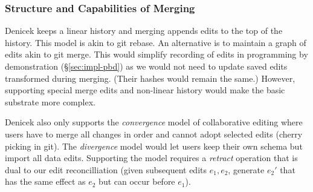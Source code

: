 \documentclass[sigconf,anonymous,screen]{acmart}
\newcommand{\ident}[1]{{\sffamily #1}}
\newcommand{\note}[1]{\textcolor{red}{#1}}
\begin{document}
%
%


\subsubsection*{Structure and Capabilities of Merging}
Denicek keeps a linear history and merging appends edits to the top of the history.
This model is akin to git rebase. An alternative is to maintain a graph of edits akin
to git merge. This would simplify recording of edits in programming by demonstration
(\S\ref{sec:impl-pbd}) as we would not need to update saved edits transformed
during merging. (Their hashes would remain the same.) However, supporting special
merge edits and non-linear history would make the basic substrate more complex.

Denicek also only supports the \emph{convergence} model of collaborative editing \cite{edwards-2025-schema}
where users have to merge all changes in order and cannot adopt selected edits (cherry
picking in git). The \emph{divergence} model would let users keep their own schema but
import all data edits. Supporting the model requires a \emph{retract} operation \cite{edwards-2021-typed}
that is dual to our edit reconcilliation (given subsequent edits $e_1, e_2$, generate
$e_2'$ that has the same effect as $e_2$ but can occur before $e_1$).
\end{document}
